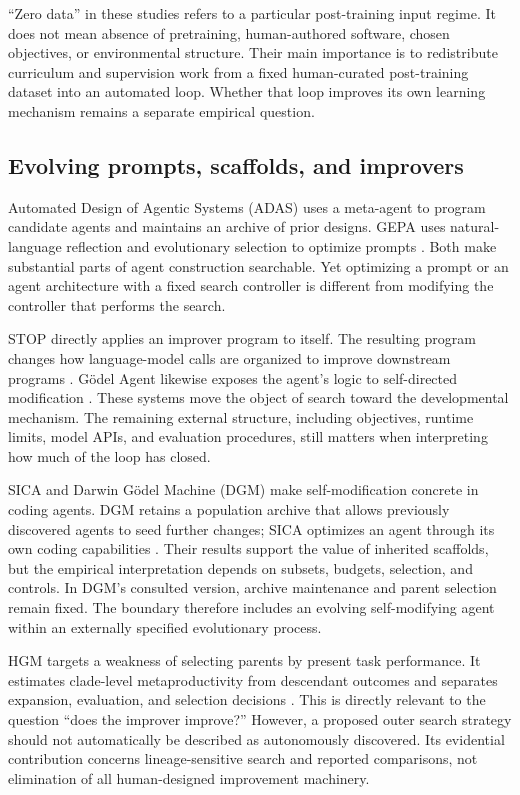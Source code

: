 \documentclass[11pt,american,]{article}
\begin{document}
``Zero data'' in these studies refers to a particular post-training
input regime. It does not mean absence of pretraining, human-authored
software, chosen objectives, or environmental structure. Their main
importance is to redistribute curriculum and supervision work from a
fixed human-curated post-training dataset into an automated loop.
Whether that loop improves its own learning mechanism remains a separate
empirical question.

\hypertarget{evolving-prompts-scaffolds-and-improvers}{%
\subsection{Evolving prompts, scaffolds, and
improvers}\label{evolving-prompts-scaffolds-and-improvers}}

Automated Design of Agentic Systems (ADAS) uses a meta-agent to program
candidate agents and maintains an archive of prior designs. GEPA uses
natural-language reflection and evolutionary selection to optimize
prompts \citep{adas2024, gepa2025}. Both make substantial parts of agent
construction searchable. Yet optimizing a prompt or an agent
architecture with a fixed search controller is different from modifying
the controller that performs the search.

STOP directly applies an improver program to itself. The resulting
program changes how language-model calls are organized to improve
downstream programs \citep{stop2023}. Gödel Agent likewise exposes the
agent's logic to self-directed modification \citep{goedelagent2024}.
These systems move the object of search toward the developmental
mechanism. The remaining external structure, including objectives,
runtime limits, model APIs, and evaluation procedures, still matters
when interpreting how much of the loop has closed.

SICA and Darwin Gödel Machine (DGM) make self-modification concrete in
coding agents. DGM retains a population archive that allows previously
discovered agents to seed further changes; SICA optimizes an agent
through its own coding capabilities \citep{sica2025, dgm2025}. Their
results support the value of inherited scaffolds, but the empirical
interpretation depends on subsets, budgets, selection, and controls. In
DGM's consulted version, archive maintenance and parent selection remain
fixed. The boundary therefore includes an evolving self-modifying agent
within an externally specified evolutionary process.

HGM targets a weakness of selecting parents by present task performance.
It estimates clade-level metaproductivity from descendant outcomes and
separates expansion, evaluation, and selection decisions
\citep{hgm2025}. This is directly relevant to the question ``does the
improver improve?'' However, a proposed outer search strategy should not
automatically be described as autonomously discovered. Its evidential
contribution concerns lineage-sensitive search and reported comparisons,
not elimination of all human-designed improvement machinery.
\end{document}
